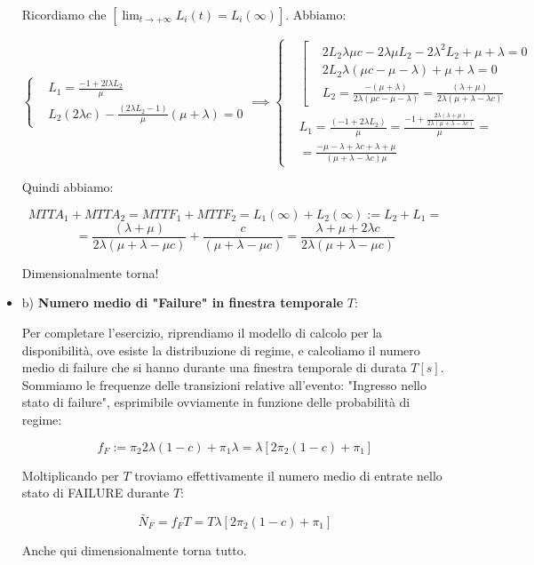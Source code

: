 \begin{itemize}
Ricordiamo che $[\lim_{t\to +\infty}{L_i(t)} = L_i(\infty)]$. Abbiamo:

\[
	\left\{
	\begin{aligned}
	&L_1 = \frac{-1+2l\lambda L_2}{\mu}\\
	&L_2(2\lambda c) - \frac{(2\lambda L_2 -1)}{\mu}(\mu+\lambda) = 0
	\end{aligned}
	\right. \implies
	\left\{
	\begin{aligned}
	&\left[
	\begin{aligned}
	&2L_2\lambda\mu c - 2\lambda\mu L_2 -2\lambda^2L_2 + \mu + \lambda = 0\\
	&2L_2\lambda(\mu c - \mu-\lambda)+\mu+\lambda = 0\\
	&L_2 = \frac{-(\mu+\lambda)}{2\lambda(\mu c-\mu-\lambda)} = \frac{(\lambda+\mu)}{2\lambda(\mu+\lambda-\lambda c)}
	\end{aligned}
	\right.\\
	&L_1 = \frac{(-1+2\lambda L_2)}{\mu} = \frac{-1+\frac{2\lambda (\lambda+\mu)}{2\lambda(\mu+\lambda-\lambda c)}}{\mu} =\\
	&= \frac{-\mu-\lambda+\lambda c+\lambda+\mu}{(\mu+\lambda-\lambda c)\mu}
	\end{aligned}
	\right.
\]

Quindi abbiamo: 

\[
	MTTA_1+MTTA_2=MTTF_1+MTTF_2=L_1(\infty)+L_2(\infty) := L_2+L_1 =
\]
\[
	= \frac{(\lambda+\mu)}{2\lambda(\mu+\lambda-\mu c)} + \frac{c}{(\mu+\lambda-\mu c)} = \frac{\lambda+\mu+2\lambda c}{2\lambda(\mu+\lambda-\mu c)}
\]

Dimensionalmente torna!

\item{b)} \textbf{Numero medio di "Failure" in finestra temporale} $T$:

Per completare l'esercizio, riprendiamo il modello di calcolo per la disponibilità, ove esiste la distribuzione di regime, e calcoliamo il numero medio di failure che si hanno durante una finestra temporale di durata $T[s]$. Sommiamo le frequenze delle transizioni relative all'evento: "Ingresso nello stato di failure", esprimibile ovviamente in funzione delle probabilità di regime:

\[
	f_F := \pi_2 2\lambda(1-c) + \pi_1\lambda = \lambda[2\pi_2(1-c)+\pi_1]
\]

Moltiplicando per $T$ troviamo effettivamente il numero medio di entrate nello stato di FAILURE durante $T$:

\[
	\bar{N}_F = f_FT = T\lambda[2\pi_2(1-c)+\pi_1]
\]

Anche qui dimensionalmente torna tutto.

\end{itemize}

